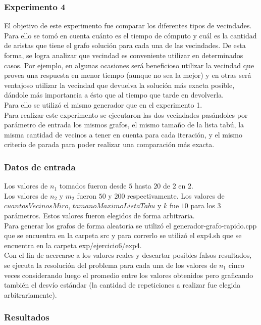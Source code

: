 \subsubsection*{Experimento 4}\;
\noindent El objetivo de este experimento fue comparar los diferentes tipos de vecindades. Para ello se tomó en cuenta cuánto es el tiempo de cómputo y cuál es la cantidad de aristas que tiene el grafo solución para cada una de las vecindades. De esta forma, se logra analizar que vecindad es conveniente utilizar en determinados casos. Por ejemplo, en algunas ocasiones será beneficioso utilizar la vecindad que provea una respuesta en menor tiempo (aunque no sea la mejor) y en otras será ventajoso utilizar la vecindad que devuelva la solución más exacta posible, dándole más importancia a ésto que al tiempo que tarde en devolverla. \\
Para ello se utilizó el mismo generador que en el experimento 1.\\
Para realizar este experimento se ejecutaron las dos vecindades pasándoles por parámetro de entrada los mismos grafos, el mismo tamaño de la lista tabú, la misma cantidad de vecinos a tener en cuenta para cada iteración, y el mismo criterio de parada para poder realizar una comparación más exacta. 

\subsubsection*{Datos de entrada}\;
\noindent Los valores de $n_1$ tomados fueron desde $5$ hasta $20$ de $2$ en $2$. \\
       Los valores de $n_2$ y $m_2$ fueron $50$ y $200$ respectivamente. Los valores de $cuantosVecinosMiro$, $tamanoMaximoListaTabu$ y $k$ fue $10$ para los $3$ parámetros. Estos valores fueron elegidos de forma arbitraria. \\
        Para generar los grafos de forma aleatoria se utilizó el generador-grafo-rapido.cpp que se encuentra en la carpeta src y para correrlo se utilizó el exp4.sh que se encuentra en la carpeta exp/ejercicio6/exp4. \\
        Con el fin de acercarse a los valores reales y descartar posibles falsos resultados, se ejecuta la resolución del problema para cada una de los valores de $n_1$ cinco veces considerando luego el promedio entre los valores obtenidos pero graficando también el desvío estándar (la cantidad de repeticiones a realizar fue elegida arbitrariamente).\; 
\subsubsection*{Resultados}\;


